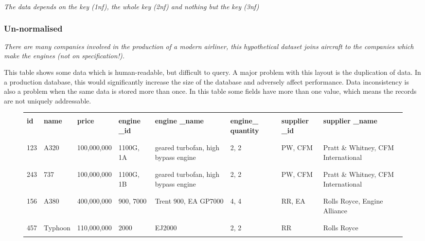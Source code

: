 \documentclass[10pt]{article}
\begin{document}
\emph{The data depends on the key (1nf), the whole key (2nf) and nothing but the key (3nf)}

\subsubsection{Un-normalised}
\label{sec:orgdca20e7}

\emph{There are many companies involved in the production of a modern airliner, this hypothetical dataset joins aircraft to the companies which make the engines (not on specification!).}

This table shows some data which is human-readable, but difficult to query. A major problem with this layout is the duplication of data. In a production database, this would significantly increase the size of the database and adversely affect performance. Data inconsistency is also a problem when the same data is stored more than once. In this table some fields have more than one value, which means the records are not uniquely addressable.


\begin{figure}[H]
\begin{center}
\begin{longtable}{ |C{0.05\textwidth}|C{0.08\textwidth}|C{0.105\textwidth}|C{0.1\textwidth}|C{0.1\textwidth}|C{0.1\textwidth}|C{0.07\textwidth}|C{0.1\textwidth}| }

\hline
&&&&&&&\\
\textbf{id} & \textbf{name} & \textbf{price} & \textbf{engine \_id} & \textbf{engine \_name} & \textbf{engine\_ quantity} & \textbf{supplier \_id} & \textbf{supplier \_name}\\
&&&&&&&\\
\hline
&&&&&&&\\
123 & A320 & 100,000,000 & 1100G, 1A & geared turbofan, high bypass engine & 2, 2 & PW, CFM & Pratt \& Whitney, CFM International\\
&&&&&&&\\
\hline
&&&&&&&\\
243 & 737 & 100,000,000 & 1100G, 1B & geared turbofan, high bypass engine & 2, 2 & PW, CFM & Pratt \& Whitney, CFM International\\
&&&&&&&\\
\hline
&&&&&&&\\
156 & A380 & 400,000,000 & 900, 7000 & Trent 900, EA GP7000 & 4, 4 & RR, EA & Rolls Royce, Engine Alliance\\
&&&&&&&\\
\hline
&&&&&&&\\
457 & Typhoon & 110,000,000 & 2000 & EJ2000 & 2, 2 & RR & Rolls Royce\\
&&&&&&&\\
\hline
\end{longtable}
\end{center}
\end{figure}
\end{document}
